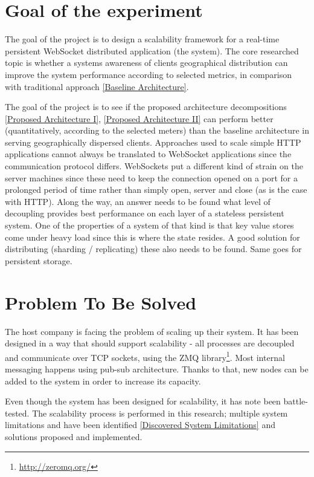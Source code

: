 \documentclass{uvamscse}
\begin{document}
\section{Goal of the experiment}

The goal of the project is to design a scalability framework for a real-time persistent WebSocket distributed application (the system). The core researched topic is whether a systems awareness of clients geographical distribution can improve the system performance according to selected metrics, in comparison with traditional approach \ref{Baseline Architecture}.

The goal of the project is to see if the proposed architecture decompositions \ref{Proposed Architecture I}, \ref{Proposed Architecture II} can perform better (quantitatively, according to the selected meters) than the baseline architecture in serving geographically dispersed clients. Approaches used to scale simple HTTP applications cannot always be translated to WebSocket applications since the communication protocol differs. WebSockets put a different kind of strain on the server machines since these need to keep the connection opened on a port for a prolonged period of time rather than simply open, server and close (as is the case with HTTP). Along the way, an answer needs to be found what level of decoupling provides best performance on each layer of a stateless persistent system. One of the properties of a system of that kind is that key value stores come under heavy load since this is where the state resides. A good solution for distributing (sharding / replicating) these also needs to be found. Same goes for persistent storage.

\section{Problem To Be Solved}
The host company is facing the problem of scaling up their system. It has been designed in a way that should support scalability - all processes are decoupled and communicate over TCP sockets, using the ZMQ library\footnote{\url{http://zeromq.org/}}. Most internal messaging happens using pub-sub architecture. Thanks to that, new nodes can be added to the system in order to increase its capacity.

Even though the system has been designed for scalability, it has note been battle-tested. The scalability process is performed in this research; multiple system limitations and have been identified \ref{Discovered System Limitations} and solutions proposed and implemented.
\end{document}
